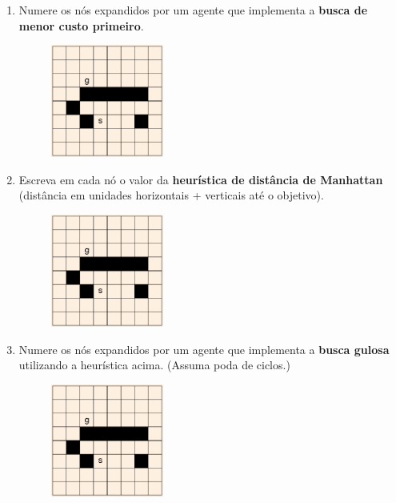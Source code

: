 \documentclass[9pt,a4paper]{extarticle}
\begin{document}
\begin{enumerate}
\begin{enumerate}[label*=\alph*)]
    \item Numere os nós expandidos por um agente que implementa a \textbf{busca de menor custo primeiro}.
    \begin{figure}[!ht]
      \centering
      \includegraphics[width=0.35\textwidth]{grid.png}
    \end{figure}

    \item Escreva em cada nó o valor da \textbf{heurística de distância de Manhattan} (distância em unidades horizontais + verticais até o objetivo).
    \begin{figure}[!ht]
      \centering
      \includegraphics[width=0.35\textwidth]{grid.png}
    \end{figure}

    \item Numere os nós expandidos por um agente que implementa a \textbf{busca gulosa} utilizando a heurística acima. (Assuma poda de ciclos.)
    \begin{figure}[!ht]
      \centering
      \includegraphics[width=0.35\textwidth]{grid.png}
    \end{figure}


\end{enumerate}
\end{enumerate}
\end{document}

